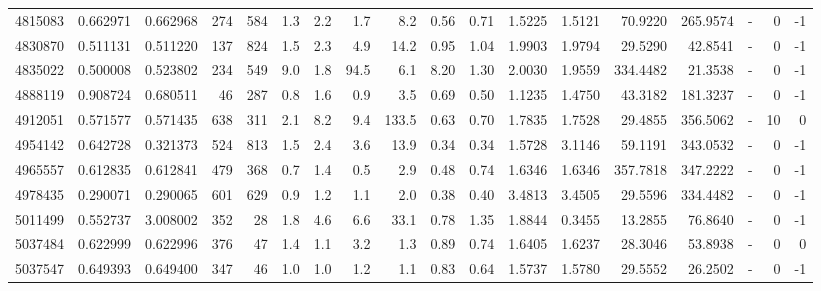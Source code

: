 \begin{tabular}{rrrrrrrrrrrrrrrlrr}
   4815083 & 0.662971 &   0.662968 &  274 &  584 &      1.3 &      2.2 &     1.7 &      8.2 &       0.56 &        0.71 &  1.5225 &  1.5121 &   70.9220 &  265.9574 &             - &        0 &         -1 \\
   4830870 & 0.511131 &   0.511220 &  137 &  824 &      1.5 &      2.3 &     4.9 &     14.2 &       0.95 &        1.04 &  1.9903 &  1.9794 &   29.5290 &   42.8541 &             - &        0 &         -1 \\
   4835022 & 0.500008 &   0.523802 &  234 &  549 &      9.0 &      1.8 &    94.5 &      6.1 &       8.20 &        1.30 &  2.0030 &  1.9559 &  334.4482 &   21.3538 &             - &        0 &         -1 \\
   4888119 & 0.908724 &   0.680511 &   46 &  287 &      0.8 &      1.6 &     0.9 &      3.5 &       0.69 &        0.50 &  1.1235 &  1.4750 &   43.3182 &  181.3237 &             - &        0 &         -1 \\
   4912051 & 0.571577 &   0.571435 &  638 &  311 &      2.1 &      8.2 &     9.4 &    133.5 &       0.63 &        0.70 &  1.7835 &  1.7528 &   29.4855 &  356.5062 &             - &       10 &          0 \\
   4954142 & 0.642728 &   0.321373 &  524 &  813 &      1.5 &      2.4 &     3.6 &     13.9 &       0.34 &        0.34 &  1.5728 &  3.1146 &   59.1191 &  343.0532 &             - &        0 &         -1 \\
   4965557 & 0.612835 &   0.612841 &  479 &  368 &      0.7 &      1.4 &     0.5 &      2.9 &       0.48 &        0.74 &  1.6346 &  1.6346 &  357.7818 &  347.2222 &             - &        0 &         -1 \\
   4978435 & 0.290071 &   0.290065 &  601 &  629 &      0.9 &      1.2 &     1.1 &      2.0 &       0.38 &        0.40 &  3.4813 &  3.4505 &   29.5596 &  334.4482 &             - &        0 &         -1 \\
   5011499 & 0.552737 &   3.008002 &  352 &   28 &      1.8 &      4.6 &     6.6 &     33.1 &       0.78 &        1.35 &  1.8844 &  0.3455 &   13.2855 &   76.8640 &             - &        0 &         -1 \\
   5037484 & 0.622999 &   0.622996 &  376 &   47 &      1.4 &      1.1 &     3.2 &      1.3 &       0.89 &        0.74 &  1.6405 &  1.6237 &   28.3046 &   53.8938 &             - &        0 &          0 \\
   5037547 & 0.649393 &   0.649400 &  347 &   46 &      1.0 &      1.0 &     1.2 &      1.1 &       0.83 &        0.64 &  1.5737 &  1.5780 &   29.5552 &   26.2502 &             - &        0 &         -1 \\

\end{tabular}
